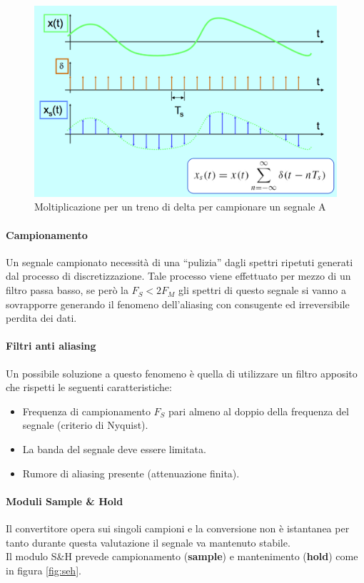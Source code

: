 \documentclass[12pt]{article}
\begin{document}
\begin{figure}[!hp]
  \includegraphics[width=\textwidth]{images/delta.png}
  \caption{Moltiplicazione per un treno di delta per campionare un segnale A}
  \label{fig:delta}
\end{figure}

\paragraph{Campionamento} Un segnale campionato necessità di una ``pulizia'' dagli spettri ripetuti generati dal processo di discretizzazione. Tale processo viene effettuato per mezzo di un filtro passa basso, se però la $F_{S}<2F_{M}$ gli spettri di questo segnale si vanno a sovrapporre generando il fenomeno dell'aliasing con consugente ed irreversibile perdita dei dati.

\paragraph{Filtri anti aliasing} Un possibile soluzione a questo fenomeno è quella di utilizzare un filtro apposito che rispetti le seguenti caratteristiche:
\begin{itemize}
  \item Frequenza di campionamento $F_{S}$ pari almeno al doppio della frequenza del segnale (criterio di Nyquist).
  \item La banda del segnale deve essere limitata.
  \item Rumore di aliasing presente (attenuazione finita).
\end{itemize}

\paragraph{Moduli Sample \& Hold} Il convertitore opera sui singoli campioni e la conversione non è istantanea per tanto durante questa valutazione il segnale va mantenuto stabile.\\
Il modulo S\&H prevede campionamento (\textbf{sample}) e mantenimento (\textbf{hold}) come in figura \ref{fig:seh}.
\end{document}
